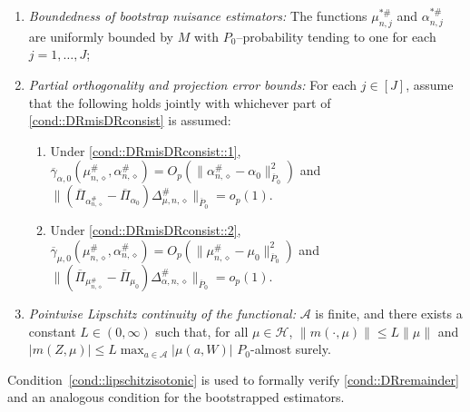 \documentclass[11pt]{article}
\theoremstyle{plain}
\begin{document}
\begin{enumerate}[label=\bf{D\arabic*)}, ref={D\arabic*}, resume=cond]
 \item \textit{Boundedness of bootstrap nuisance estimators:} \label{cond::estboundboot} The functions $\mu_{n,j}^{*\#}$ and $\alpha_{n,j}^{*\#}$ are uniformly bounded by $M$ with $P_0$--probability tending to one for each $j=1,\ldots,J$;

\item \textit{Partial orthogonality and projection error bounds:}
\label{cond::mainprojectioncoupling1::boot}
For each $j \in [J]$, assume that the following holds jointly with whichever
part of \ref{cond::DRmisDRconsist} is assumed:
\begin{enumerate}[label={\roman*)}, ref={\ref{cond::mainprojectioncoupling1::boot}\roman*}]\vspace{-.05in}
  \item \label{cond::mainprojectioncoupling1:i::boot}
  Under \ref{cond::DRmisDRconsist::1},
  $\overline{\gamma}_{\alpha,0}(\mu_{n,\diamond}^\#, \alpha_{n,\diamond}^\#) = O_p(\|\alpha_{n,\diamond}^\# - \alpha_0\|_{\overline{P}_0}^2)$ and
  $\|(\overline{\Pi}_{\alpha_{n,\diamond}^\#} - \overline{\Pi}_{\alpha_0})\Delta_{\mu,n,\diamond}^\#\|_{\overline{P}_0}
  = o_p(1)$. 
  \item \label{cond::mainprojectioncoupling1:ii::boot}
Under \ref{cond::DRmisDRconsist::2}, 
  $\overline{\gamma}_{\mu,0}(\mu_{n,\diamond}^\#, \alpha_{n,\diamond}^\#) = O_p(\|\mu_{n,\diamond}^\# - \mu_0\|_{\overline{P}_0}^2)$ and
  $\|(\overline{\Pi}_{\mu_{n,\diamond}^\#} - \overline{\Pi}_{\mu_0})\Delta_{\alpha,n,\diamond}^\#\|_{\overline{P}_0}
  = o_p(1)$.
\end{enumerate}
    \item \textit{Pointwise Lipschitz continuity of the functional:} \label{cond::lipschitzisotonic} 
$\mathcal{A}$ is finite, and there exists a constant $L \in (0,\infty)$ such that, for all $\mu \in \mathcal{H}$, $\|m(\cdot,\mu)\| \leq L\|\mu\|$ and $|m(Z,\mu)| \leq L \max_{a \in \mathcal{A}} |\mu(a,W)|$ $P_0$-almost surely.
    \end{enumerate}
Condition~\ref{cond::lipschitzisotonic} is used to formally verify \ref{cond::DRremainder} and an analogous condition for the
bootstrapped estimators.

 
\end{document}
